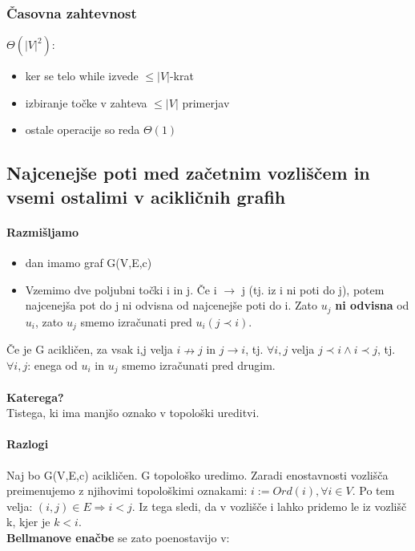 \documentclass[a4paper,10pt]{article}
\begin{document}
\subsubsection{\v Casovna zahtevnost}

$\Theta (\vert V \vert ^2)$:
\begin{itemize}
\item ker se telo while izvede $\leq \vert V \vert$-krat
\item izbiranje to\v cke v zahteva $\leq \vert V \vert$ primerjav
\item ostale operacije so reda $\Theta (1)$
\end{itemize}

\subsection{Najcenej\v se poti med za\v cetnim vozli\v s\v cem in vsemi ostalimi v acikli\v cnih grafih}

\paragraph{Razmi\v sljamo}
\begin{itemize}
\item dan imamo graf G(V,E,c)
\item Vzemimo dve poljubni to\v cki i in j. \v Ce i $\rightarrow$ j (tj. iz i ni poti do j), potem najcenej\v sa pot do j ni odvisna od najcenej\v se poti do i. Zato $u_j$ \textbf{ni odvisna} od $u_i$, zato $u_j$ smemo izra\v cunati pred $u_i (j \prec i)$.
\end{itemize}
\v Ce je G acikli\v cen, za vsak i,j velja $i \nrightarrow j$ in $j \rightarrow i$, tj. $\forall i,j$ velja $j \prec i \wedge i \prec j$, tj. $\forall i,j$: enega od $u_i$ in $u_j$ smemo izra\v cunati pred drugim.\\
\\
\textbf{Katerega?} \\
Tistega, ki ima manj\v so oznako v topolo\v ski ureditvi.

\paragraph{Razlogi}
Naj bo G(V,E,c) acikli\v cen. G topolo\v sko uredimo. Zaradi enostavnosti vozli\v s\v ca preimenujemo z njihovimi topolo\v skimi oznakami: $i:=Ord(i), \forall i \in V$. Po tem velja: $(i,j) \in E \Rightarrow i < j$. Iz tega sledi, da v vozli\v s\v ce i lahko pridemo le iz vozli\v s\v c k, kjer je $k < i$.\\
\textbf{Bellmanove ena\v cbe} se zato poenostavijo v:
\end{document}
